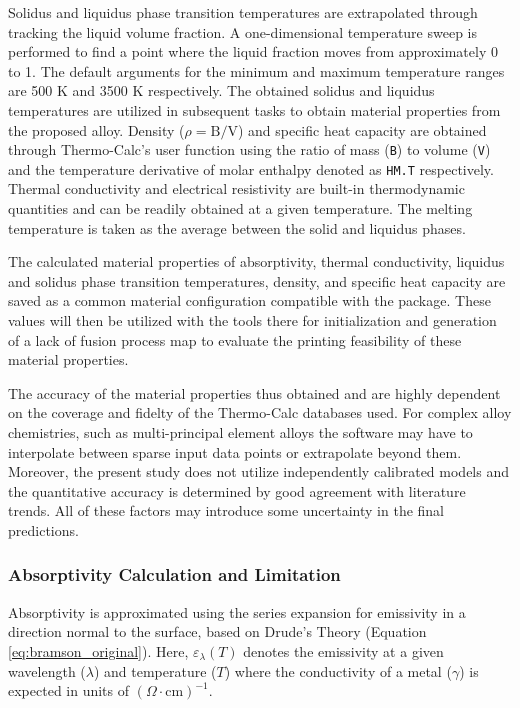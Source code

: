 Solidus and liquidus phase transition temperatures are extrapolated through
tracking the liquid volume fraction. A one-dimensional temperature sweep is
performed to find a point where the liquid fraction moves from approximately 0
to 1. The default arguments for the minimum and maximum temperature ranges are
500 K and 3500 K respectively. The obtained solidus and liquidus temperatures
are utilized in subsequent tasks to obtain material properties from the proposed
alloy. Density ($\rho = \mathrm{B}/\mathrm{V}$) and specific heat capacity are
obtained through Thermo-Calc's user function using the ratio of mass
(\texttt{B}) to volume (\texttt{V}) and the temperature derivative of molar
enthalpy denoted as \texttt{HM.T} respectively. Thermal conductivity and
electrical resistivity are built-in thermodynamic quantities and can be readily
obtained at a given temperature. The melting temperature is taken as the average
between the solid and liquidus phases.

The calculated material properties of absorptivity, thermal conductivity,
liquidus and solidus phase transition temperatures, density, and specific heat
capacity are saved as a common material configuration compatible with the
\texttt{} package. These values will then be
utilized with the tools there for initialization and generation of a lack of
fusion process map to evaluate the printing feasibility of these material
properties.

The accuracy of the material properties thus obtained and are highly dependent
on the coverage and fidelty of the Thermo-Calc databases used. For complex alloy
chemistries, such as multi-principal element alloys the software may have to
interpolate between sparse input data points or extrapolate beyond them.
Moreover, the present study does not utilize independently calibrated models and
the quantitative accuracy is determined by good agreement with literature
trends. All of these factors may introduce some uncertainty in the final
predictions.

\subsubsection{Absorptivity Calculation and Limitation}
Absorptivity is approximated using the series expansion for emissivity in a
direction normal to the surface, based on Drude's Theory (Equation
\ref{eq:bramson_original}). \cite{bramson_infrared_1968} Here,
$\varepsilon_\lambda\left(T\right)$ denotes the emissivity at a given wavelength
($\lambda$) and temperature ($T$) where the conductivity of a metal ($\gamma$)
is expected in units of $(\Omega \cdot \mathrm{cm})^{-1}$.

